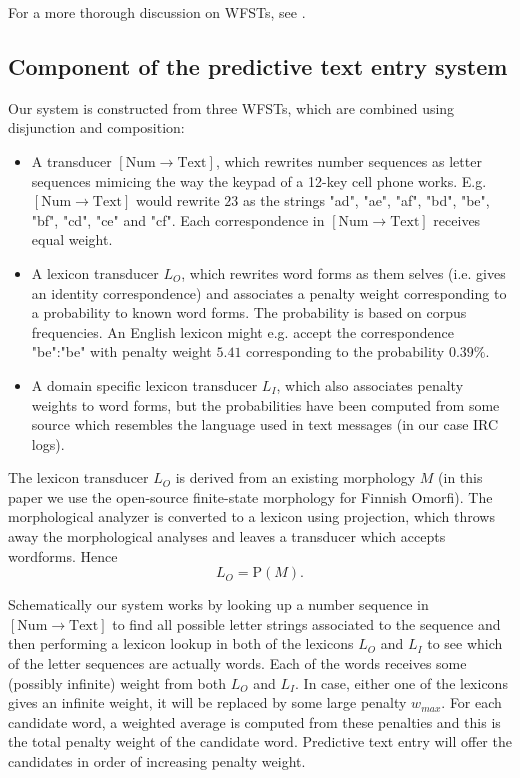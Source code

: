 \documentclass[a4paper,conference]{IEEEtran}
\begin{document}
For a more thorough discussion on WFSTs, see \cite{openfst/2007}.

\subsection{Component of the predictive text entry system}

Our system is constructed from three WFSTs, which are combined using
disjunction and composition:

\begin{itemize}
\item A transducer $[\mathrm{Num}\rightarrow\mathrm{Text}]$, which
  rewrites number sequences as letter sequences mimicing the way the
  keypad of a 12-key cell phone
  works. E.g. $[\mathrm{Num}\rightarrow\mathrm{Text}]$ would rewrite
  $23$ as the strings "ad", "ae", "af", "bd", "be", "bf", "cd", "ce"
  and "cf". Each correspondence in $[\mathrm{Num}\rightarrow\mathrm{Text}]$
  receives equal weight.
\item A lexicon transducer $L_O$, which rewrites word forms as them
  selves (i.e. gives an identity correspondence) and associates a
  penalty weight corresponding to a probability to known word
  forms. The probability is based on corpus frequencies. An English
  lexicon might e.g. accept the correspondence "be":"be" with penalty
  weight $5.41$ corresponding to the probability $0.39\%$.
\item A domain specific lexicon transducer $L_I$, which also
  associates penalty weights to word forms, but the probabilities have
  been computed from some source which resembles the language used in
  text messages (in our case IRC logs).
\end{itemize}

The lexicon transducer $L_O$ is derived from an existing morphology $M$
(in this paper we use the open-source finite-state morphology for
Finnish Omorfi). The morphological analyzer is converted to a lexicon
using projection, which throws away the morphological analyses and
leaves a transducer which accepts wordforms. Hence 
\begin{equation}L_O = \mathrm{P}(M)\text{.}\end{equation}

Schematically our system works by looking up a number sequence in
$[\mathrm{Num}\rightarrow\mathrm{Text}]$ to find all possible letter
strings associated to the sequence and then performing a lexicon
lookup in both of the lexicons $L_O$ and $L_I$ to see which of the
letter sequences are actually words. Each of the words receives some
(possibly infinite) weight from both $L_O$ and $L_I$. In case, either
one of the lexicons gives an infinite weight, it will be replaced by
some large penalty $w_{max}$. For each candidate word, a weighted
average is computed from these penalties and this is the total penalty
weight of the candidate word. Predictive text entry will offer the
candidates in order of increasing penalty weight.
\end{document}
